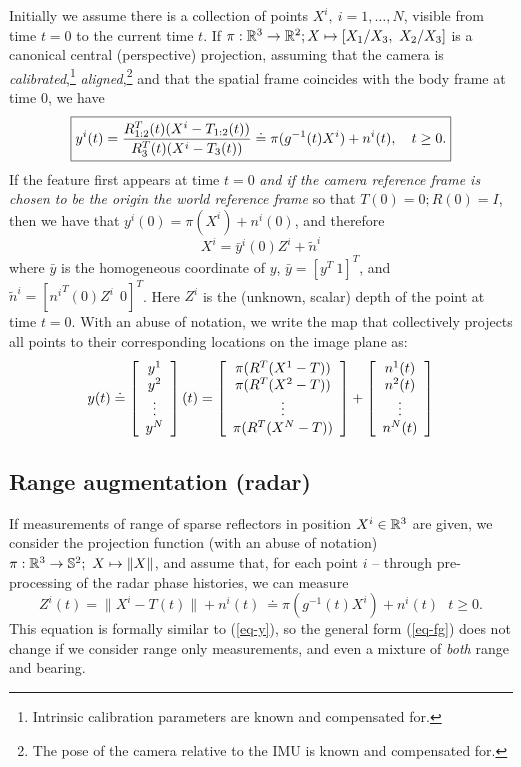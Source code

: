 Initially we assume there is a collection of points $X^i, \ i = 1, \dots, N$, visible from time $t=0$ to the current time $t$. If $\pi:\mathbb{R}^3 \rightarrow \mathbb{R}^2; X \mapsto [X_1/X_3, \ X_2/X_3]$ is a canonical central (perspective) projection, assuming that the camera is {\em calibrated},\footnote{Intrinsic calibration parameters are known and compensated for.} {\em aligned},\footnote{The pose of the camera relative to the IMU is known and compensated for.} and that the spatial frame coincides with the body frame at time $0$, we have
\begin{equation}
\boxed{y^i(t) = {\color{black} \frac{R^T_{1:2}(t) (X^i - T_{1:2}(t))}{R^T_{3}(t)( X^i - T_3(t))}} \doteq  \pi(g^{-1}(t)X^i) + n^i(t), ~~~ {\color{black} t \ge 0.}}
\label{eq-y}
\end{equation}
If the feature first appears at time $t = 0$ {\em and if the camera reference frame is chosen to be the origin the world reference frame} so that $T(0) = 0; R(0) = I$, then we have that $y^i(0) = \pi(X^i) +n^i(0)$, and therefore
\begin{equation}
\boxed{X^i = \bar y^i(0)Z^i + \tilde n^i}
\label{eq-trian}
\end{equation}
where $\bar y$ is the homogeneous coordinate of $y$, $\bar y = [y^T \ 1]^T$, and $\tilde n^i = [{n^i}^T(0)Z^i \ \  0]^T$. Here $Z^i$ is the (unknown, scalar) depth of the point at time $t = 0$. With an abuse of notation, we write the map that collectively projects all points to their corresponding locations on the image plane as:
\begin{equation}
y(t) \doteq \ba{c}
y^1 \\ y^2 \\ \vdots \\ y^N \ea (t)
 = \ba{c}
\pi(R^T(X^1 - T)) \\
\pi(R^T(X^2- T)) \\
\vdots\\
\pi(R^T( X^N- T))
\ea
+ \ba{c}
n^1(t) \\ n^2(t) \\ \vdots \\ n^N(t) \ea 
\label{eq-vis}
\end{equation}


\subsection{Range augmentation (radar)}

If measurements of range of sparse reflectors in position $X^i \in \mathbb{R}^3$ are given, we consider the projection function (with an abuse of notation) $\pi: \mathbb{R}^3 \rightarrow {\mathbb S}^2; \ X \mapsto \| X \|$, and assume that, for each point $i$ -- through pre-processing of the radar phase histories, we can measure
\begin{equation}
\boxed{Z^i(t) = \| X^i - T(t) \| + n^i(t) ~  \doteq \pi(g^{-1}(t)X^i) + n^i(t) ~~~ t \ge 0.}
\end{equation}
This equation is formally similar to (\ref{eq-y}), so the general form (\ref{eq-fg}) does not change if we consider range only measurements, and even a mixture of {\em both} range and bearing. 

